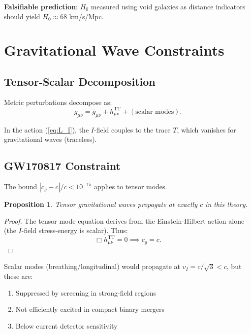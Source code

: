 \documentclass[12pt, a4paper]{article}
\newtheorem{proposition}{Proposition}
\begin{document}
\textbf{Falsifiable prediction}: $H_0$ measured using void galaxies as distance indicators should yield $H_0 \approx 68$ km/s/Mpc.


\section{Gravitational Wave Constraints}

\subsection{Tensor-Scalar Decomposition}

Metric perturbations decompose as:
\begin{equation}
    g_{\mu\nu} = \bar{g}_{\mu\nu} + h_{\mu\nu}^{\text{TT}} + (\text{scalar modes}).
\end{equation}

In the action (\ref{eq:L_I}), the $I$-field couples to the trace $T$, which vanishes for gravitational waves (traceless).

\subsection{GW170817 Constraint}

The bound $|c_g - c|/c < 10^{-15}$ \cite{GW170817} applies to tensor modes.

\begin{proposition}
Tensor gravitational waves propagate at exactly $c$ in this theory.
\end{proposition}

\begin{proof}
The tensor mode equation derives from the Einstein-Hilbert action alone (the $I$-field stress-energy is scalar). Thus:
\[
    \Box h_{\mu\nu}^{\text{TT}} = 0 \implies c_g = c.
\]
\end{proof}

Scalar modes (breathing/longitudinal) would propagate at $v_I = c/\sqrt{3} < c$, but these are:
\begin{enumerate}
    \item Suppressed by screening in strong-field regions
    \item Not efficiently excited in compact binary mergers
    \item Below current detector sensitivity
\end{enumerate}
\end{document}
